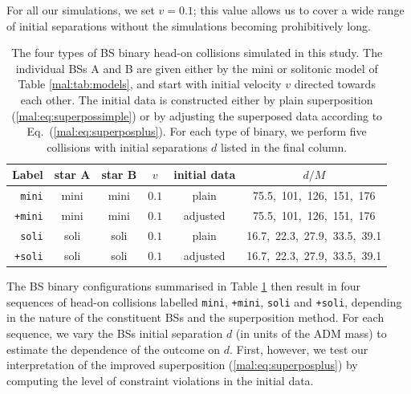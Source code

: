 For all our simulations, we
set $v=0.1$; this value
allows us to cover a wide range of initial separations
without the simulations becoming prohibitively long.
%
\begin{table}[t]
    \centering
    \caption{The four types of BS binary head-on collisions simulated
    in this study. The individual BSs A and B are given either
    by the mini or solitonic model of Table \ref{mal:tab:models},
    and start with initial
    velocity $v$ directed towards each other. The initial data
    is constructed either by plain superposition
    (\ref{mal:eq:superpossimple}) or by adjusting
    the superposed data according to Eq.~(\ref{mal:eq:superposplus}).
    For each type of binary, we perform five collisions with
    initial separations $d$ listed in the final column.
    }
    \begin{tabular}{r|ccccc}
    \hline
    Label & star A & star B & $v$ & initial data & $d/M$ \\
    \hline
    {\tt mini} & mini & mini & $0.1$ & plain &
    75.5,~101,~126,~151,~176 \\
    {\tt +mini}& mini & mini & $0.1$ & adjusted &
    75.5,~101,~126,~151,~176 \\
    {\tt soli} & soli & soli & $0.1$ & plain &
    16.7,~22.3,~27.9,~33.5,~39.1 \\
    {\tt +soli} & soli & soli & $0.1$ &
    adjusted &
    16.7,~22.3,~27.9,~33.5,~39.1 \\
    \hline
    \end{tabular}
    \label{mal:tab:hods}
\end{table}
%
The BS binary configurations
summarised in Table \ref{mal:tab:hods} then result
in four sequences of head-on collisions labelled
{\tt mini}, {\tt +mini}, {\tt soli} and {\tt +soli},
depending in the nature of the constituent BSs and
the superposition method. For each sequence, we vary the
BSs initial separation $d$ (in units of the ADM mass) to
estimate the dependence of the
outcome on $d$. First, however, we test our interpretation
of the improved superposition (\ref{mal:eq:superposplus})
by computing the level of constraint violations in the
initial data.
